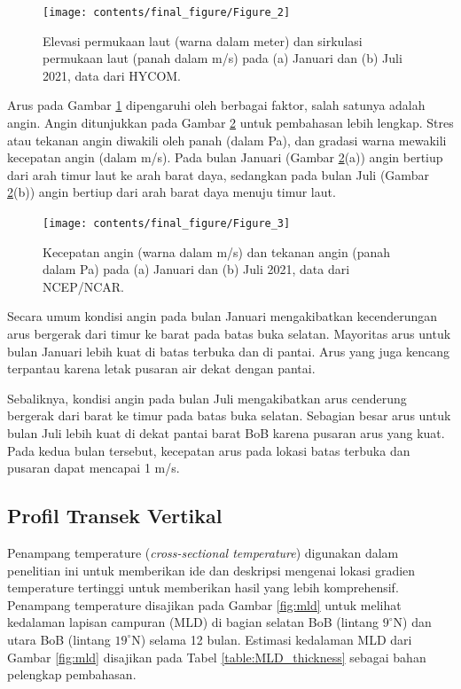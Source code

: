 \begin{spacing}{1.5}
	\begin{figure}[H]
		\centering
		\texttt{[image: contents/final\_figure/Figure\_2]}
		\caption{Elevasi permukaan laut (warna dalam meter) dan sirkulasi permukaan laut (panah dalam m/s) pada (a) Januari dan (b) Juli 2021, data dari HYCOM.}
		\label{fig:arus}
	\end{figure}

	Arus pada Gambar \ref{fig:arus} dipengaruhi oleh berbagai faktor, salah satunya adalah angin. Angin ditunjukkan pada Gambar \ref{fig:angin} untuk pembahasan lebih lengkap. Stres atau tekanan angin diwakili oleh panah (dalam Pa), dan gradasi warna mewakili kecepatan angin (dalam m/s). Pada bulan Januari (Gambar \ref{fig:angin}(a)) angin bertiup dari arah timur laut ke arah barat daya, sedangkan pada bulan Juli (Gambar \ref{fig:angin}(b)) angin bertiup dari arah barat daya menuju timur laut.
	
	\begin{figure}[H]
		\centering
		\texttt{[image: contents/final\_figure/Figure\_3]}
		\caption{Kecepatan angin (warna dalam m/s) dan tekanan angin (panah dalam Pa) pada (a) Januari dan (b) Juli 2021, data dari NCEP/NCAR.}
		\label{fig:angin}
	\end{figure}
	
	Secara umum kondisi angin pada bulan Januari mengakibatkan kecenderungan arus bergerak dari timur ke barat pada batas buka selatan. Mayoritas arus untuk bulan Januari lebih kuat di batas terbuka dan di pantai. Arus yang juga kencang terpantau karena letak pusaran air dekat dengan pantai.
	
	Sebaliknya, kondisi angin pada bulan Juli mengakibatkan arus cenderung bergerak dari barat ke timur pada batas buka selatan. Sebagian besar arus untuk bulan Juli lebih kuat di dekat pantai barat BoB karena pusaran arus yang kuat. Pada kedua bulan tersebut, kecepatan arus pada lokasi batas terbuka dan pusaran dapat mencapai 1 m/s.
	
\subsection[Profil Transek Vertikal]{Profil Transek Vertikal}
	
	Penampang temperature (\textit{cross-sectional temperature}) digunakan dalam penelitian ini untuk memberikan ide dan deskripsi mengenai lokasi gradien temperature tertinggi untuk memberikan hasil yang lebih komprehensif. Penampang temperature disajikan pada Gambar \ref{fig:mld} untuk melihat kedalaman lapisan campuran (MLD) di bagian selatan BoB (lintang $9^\circ$N) dan utara BoB (lintang $19^\circ$N) selama 12 bulan. Estimasi kedalaman MLD dari Gambar \ref{fig:mld} disajikan pada Tabel \ref{table:MLD_thickness} sebagai bahan pelengkap pembahasan.
	

\end{spacing}
